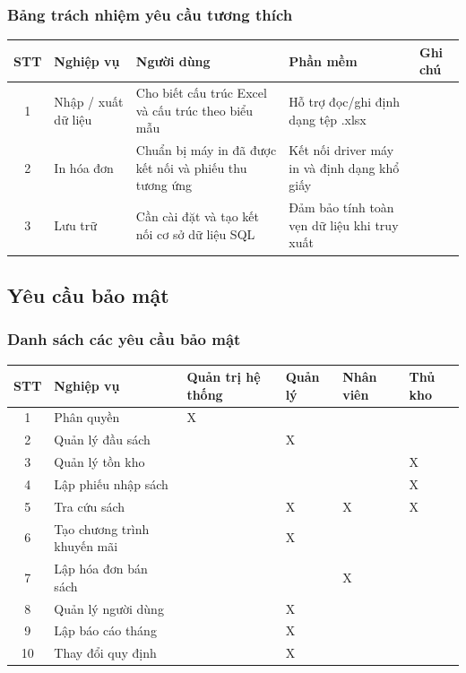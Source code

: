 \documentclass[12pt]{report}
\begin{document}
            \subsubsection{Bảng trách nhiệm yêu cầu tương thích}
                \begin{tabularx}{\textwidth}{|c|l|>{\RaggedRight}X|>{\RaggedRight}X|l|}
                    \hline
                    \textbf{STT} & \textbf{Nghiệp vụ} & 
                    \textbf{Người dùng} & \textbf{Phần mềm} & \textbf{Ghi chú} \\ \hline
                    1 & Nhập / xuất dữ liệu & Cho biết cấu trúc Excel và cấu trúc theo biểu mẫu & Hỗ trợ đọc/ghi định dạng tệp .xlsx & \\ \hline
                    2 & In hóa đơn & Chuẩn bị máy in đã được kết nối và phiếu thu tương ứng & Kết nối driver máy in và định dạng khổ giấy & \\ \hline
                    3 & Lưu trữ & Cần cài đặt và tạo kết nối cơ sở dữ liệu SQL & Đảm bảo tính toàn vẹn dữ liệu khi truy xuất & \\ \hline
                \end{tabularx}
        \subsection{Yêu cầu bảo mật}
            \subsubsection{Danh sách các yêu cầu bảo mật}
                \begin{tabularx}{\textwidth}{|c|>{\RaggedRight}X|>{\RaggedRight}X|>{\RaggedRight}X|>{\RaggedRight}X|>{\RaggedRight}X|}
                    \hline
                    \textbf{STT} & \textbf{Nghiệp vụ} & 
                    \textbf{Quản trị hệ thống} & \textbf{Quản lý} & \textbf{Nhân viên} & \textbf{Thủ kho} \\ \hline
                    1 & Phân quyền & X & & & \\ \hline
                    2 & Quản lý đầu sách & & X & & \\ \hline
                    3 & Quản lý tồn kho & & & & X \\ \hline
                    4 & Lập phiếu nhập sách & & & & X \\ \hline
                    5 & Tra cứu sách & & X & X & X \\ \hline
                    6 & Tạo chương trình khuyến mãi & & X & & \\ \hline
                    7 & Lập hóa đơn bán sách & & & X & \\ \hline
                    8 & Quản lý người dùng & & X & & \\ \hline
                    9 & Lập báo cáo tháng & & X & & \\ \hline
                    10 & Thay đổi quy định & & X & & \\ \hline
                \end{tabularx}
\end{document}
